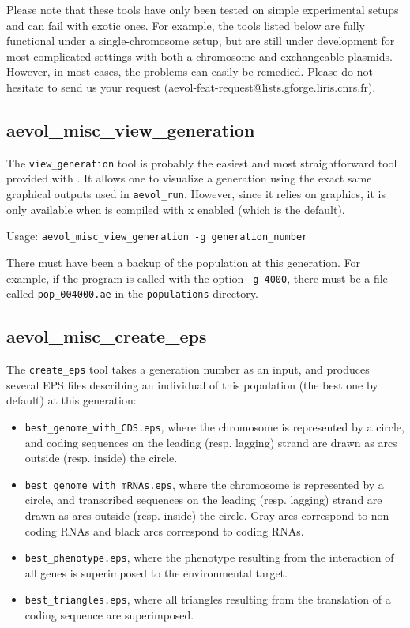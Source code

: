 Please note that these tools have only been tested on simple experimental setups and can fail with exotic ones. For example, the tools listed below are fully functional under a single-chromosome setup, but are still under development for most complicated settings with both a chromosome and exchangeable plasmids. However, in most cases, the problems can easily be remedied. Please do not hesitate to send us your request (aevol-feat-request@lists.gforge.liris.cnrs.fr).


\subsection{aevol\_misc\_view\_generation}
\label{sect:view-gener}
The \verb?view_generation? tool is probably the easiest and most straightforward tool provided with \aevol{}.
It allows one to visualize a generation using the exact same graphical outputs used in \verb?aevol_run?.
However, since it relies on graphics, it is only available when \aevol{} is compiled with x enabled (which is the default).

Usage: \verb?aevol_misc_view_generation -g generation_number?

There must have been a backup of the population at this generation. For example, if the program is called with the option
\verb?-g 4000?, there must be a file called \verb?pop_004000.ae? in the \verb?populations? directory.


\subsection{aevol\_misc\_create\_eps}
\label{sect:create-eps}
The \verb?create_eps? tool takes a generation number as an input, and produces several EPS files describing an individual of this population (the best one by default) at this generation:
\begin{itemize}
\item \verb?best_genome_with_CDS.eps?, where the chromosome is represented by a circle, and coding sequences on the leading (resp. lagging) strand are drawn as arcs outside (resp. inside) the circle.
\item \verb?best_genome_with_mRNAs.eps?, where the chromosome is represented by a circle, and transcribed sequences on the leading (resp. lagging) strand are drawn as arcs outside (resp. inside) the circle. Gray arcs correspond to non-coding RNAs and black arcs correspond to coding RNAs.
\item \verb?best_phenotype.eps?, where the phenotype resulting from the interaction of all genes is superimposed to the environmental target.
\item \verb?best_triangles.eps?, where all triangles resulting from the translation of a coding sequence are superimposed.
\end{itemize}


